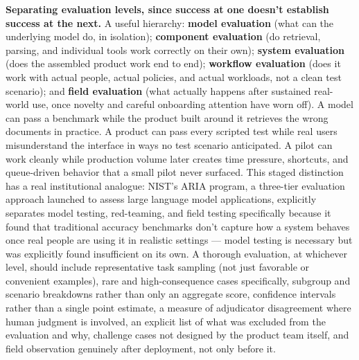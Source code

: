 \textbf{Separating evaluation levels, since success at one doesn't establish success at the next.} A useful hierarchy: \textbf{model evaluation} (what can the underlying model do, in isolation); \textbf{component evaluation} (do retrieval, parsing, and individual tools work correctly on their own); \textbf{system evaluation} (does the assembled product work end to end); \textbf{workflow evaluation} (does it work with actual people, actual policies, and actual workloads, not a clean test scenario); and \textbf{field evaluation} (what actually happens after sustained real-world use, once novelty and careful onboarding attention have worn off). A model can pass a benchmark while the product built around it retrieves the wrong documents in practice. A product can pass every scripted test while real users misunderstand the interface in ways no test scenario anticipated. A pilot can work cleanly while production volume later creates time pressure, shortcuts, and queue-driven behavior that a small pilot never surfaced. This staged distinction has a real institutional analogue: NIST's ARIA program, a three-tier evaluation approach launched to assess large language model applications, explicitly separates model testing, red-teaming, and field testing specifically because it found that traditional accuracy benchmarks don't capture how a system behaves once real people are using it in realistic settings --- model testing is necessary but was explicitly found insufficient on its own. A thorough evaluation, at whichever level, should include representative task sampling (not just favorable or convenient examples), rare and high-consequence cases specifically, subgroup and scenario breakdowns rather than only an aggregate score, confidence intervals rather than a single point estimate, a measure of adjudicator disagreement where human judgment is involved, an explicit list of what was excluded from the evaluation and why, challenge cases not designed by the product team itself, and field observation genuinely after deployment, not only before it.

